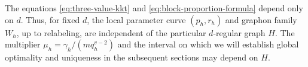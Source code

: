 \begin{remark}\label{rmk:rank-one-family-universality}
The equations \eqref{eq:three-value-kkt} and \eqref{eq:block-proportion-formula} depend only on $d$.
Thus, for fixed $d$, the local parameter curve $(p_h,r_h)$ and graphon
family $W_h$, up to relabeling, are independent of the particular
$d$-regular graph $H$.  The multiplier $\mu_h=\gamma_h/(m q_h^{v-2})$
and the interval on which we will establish global optimality and uniqueness
in the subsequent sections may depend on $H$.
\end{remark}
